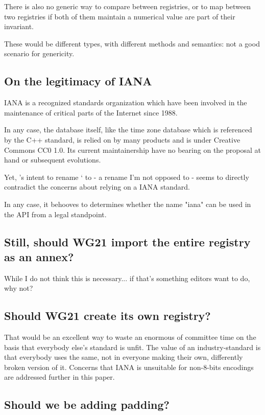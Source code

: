 \documentclass{wg21}
\begin{document}
There is also no generic way to compare between registries, or to map between two registries if both of them maintain a numerical value are part of their invariant.

These would be different types, with different methods and semantics: not a good scenario for genericity.

\subsection{On the legitimacy of IANA}

IANA is a recognized standards organization which have been involved in the maintenance of
critical parts of the Internet since 1988.

In any case, the database itself, like the time zone database which is referenced by the C++ standard, is relied on by many products and is under Creative Commons CC0 1.0. Its current maintainership have no bearing on the proposal at hand or subsequent evolutions.

Yet, 's intent to rename ` to  - a rename I'm not opposed to -
seems to directly contradict the concerns about relying on a IANA standard.

In any case, it behooves  to determines whether the name "iana" can be used in the API from a legal standpoint.


\subsection{Still, should WG21 import the entire registry as an annex?}

While I do not think this is necessary... if that's something editors want to do, why not?

\subsection{Should WG21 create its own registry?}

That would be an excellent way to waste an enormous of committee time on the basis that everybody else's standard is unfit.
The value of an industry-standard is that everybody uses the same, not in everyone making their own, differently broken version of it.
Concerns that IANA is unsuitable for non-8-bits encodings are addressed further in this paper.

\subsection{Should we be adding padding?}
\end{document}
